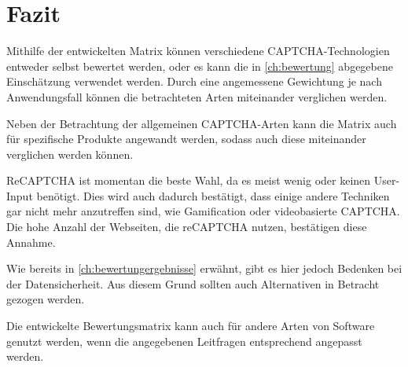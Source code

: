\chapter{Fazit}

Mithilfe der entwickelten Matrix können verschiedene CAPTCHA-Techno\-logien entweder selbst bewertet werden,
oder es kann die in \autoref{ch:bewertung} abgegebene Einschätzung verwendet werden.
Durch eine angemessene Gewichtung je nach Anwendungsfall können die betrachteten Arten miteinander verglichen werden.

Neben der Betrachtung der allgemeinen CAPTCHA-Arten kann die Matrix auch für spezifische Produkte angewandt werden,
sodass auch diese miteinander verglichen werden können.

ReCAPTCHA ist momentan die beste Wahl, da es meist wenig oder keinen User-Input benötigt.
Dies wird auch dadurch bestätigt, dass einige andere Techniken gar nicht mehr anzutreffen sind,
wie Gamification oder videobasierte CAPTCHA. 
Die hohe Anzahl der Webseiten, die reCAPTCHA nutzen, bestätigen diese Annahme. \cite{stats}

Wie bereits in \autoref{ch:bewertungergebnisse} erwähnt, gibt es hier jedoch Bedenken bei der Datensicherheit.
Aus diesem Grund sollten auch Alternativen in Betracht gezogen werden. 

Die entwickelte Bewertungsmatrix kann auch für andere Arten von Software genutzt werden,
wenn die angegebenen Leitfragen entsprechend angepasst werden. 